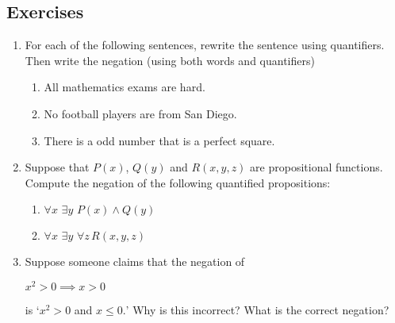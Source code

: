 \subsection*{Exercises}

\begin{enumerate}\renewcommand{\labelenumi}{\thesubsection.\theenumi}
	\item For each of the following sentences, rewrite the sentence using quantifiers. Then write the negation (using both words and quantifiers)\prelistskip
		\begin{enumerate}
		  \item All mathematics exams are hard.
	  	\item No football players are from San Diego.
	  	\item There is a odd number that is a perfect square.
		\end{enumerate}
		
    
  \item Suppose that $P(x)$, $Q(y)$ and $R(x,y,z)$ are propositional functions. Compute the negation of the following quantified propositions:
  \begin{enumerate}
    \item $\forall x \,\, \exists y \, \,P(x)\wedge Q(y)$
    \item $\forall x \, \,\exists y \, \,\forall z \, R(x,y,z)$
  \end{enumerate}
  

  \item Suppose someone claims that the negation of 
  \begin{center}
  $x^2 > 0 \implies  x > 0$ 
  \end{center} 
  is `$x^2 > 0$ and $ x \leq 0.$' 
 Why is
this incorrect? What is the correct negation?
		


\end{enumerate}
